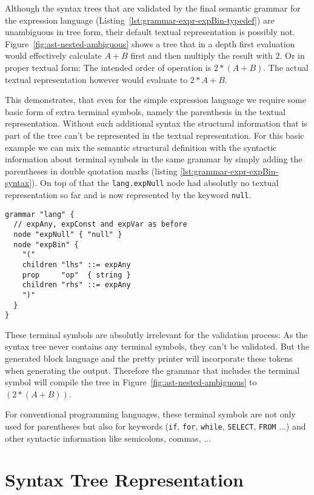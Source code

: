 \documentclass[sigconf,natbib=false]{acmart}
\begin{document}
Although the syntax trees that are validated by the final semantic grammar for the expression language (Listing~\ref{lst:grammar-expr-expBin-typedef}) are unambiguous in tree form, their default textual representation is possibly not. Figure~\ref{fig:ast-nested-ambiguous} shows a tree that in a depth first evaluation would effectively calculate $A+B$ first and then multiply the result with $2$. Or in proper textual form: The intended order of operation is $2 * (A+B)$. The actual textual representation however would evaluate to $2 * A + B$.

This demonstrates, that even for the simple expression language we require some basic form of extra terminal symbols, namely the parenthesis in the textual representation. Without such additional syntax the structural information that is part of the tree can't be represented in the textual representation. For this basic example we can mix the semantic structural definition with the syntactic information about terminal symbols in the same grammar by simply adding the parentheses in double quotation marks (listing \ref{lst:grammar-expr-expBin-syntax}). On top of that the \texttt{lang.expNull} node had absolutly no textual representation so far and is now represented by the keyword \texttt{null}.

\begin{lstlisting}[caption={Final syntactic grammar for expression \texttt{expBin}}, label=lst:grammar-expr-expBin-syntax]
grammar "lang" {
  // expAny, expConst and expVar as before
  node "expNull" { "null" }
  node "expBin" {
    "("
    children "lhs" ::= expAny
    prop     "op"  { string }
    children "rhs" ::= expAny
    ")"
  }
}
\end{lstlisting}

These terminal symbols are absolutly irrelevant for the validation process: As the syntax tree never contains any terminal symbols, they can't be validated. But the generated block language and the pretty printer will incorporate these tokens when generating the output. Therefore the grammar that includes the terminal symbol will compile the tree in Figure~\ref{fig:ast-nested-ambiguous} to $(2 * (A + B))$.

For conventional programming languages, these terminal symbols are not only used for parentheses but also for keywords (\texttt{if}, \texttt{for}, \texttt{while}, \texttt{SELECT}, \texttt{FROM} ...) and other syntactic information like semicolons, commas, ...

\section{Syntax Tree Representation}
\end{document}
